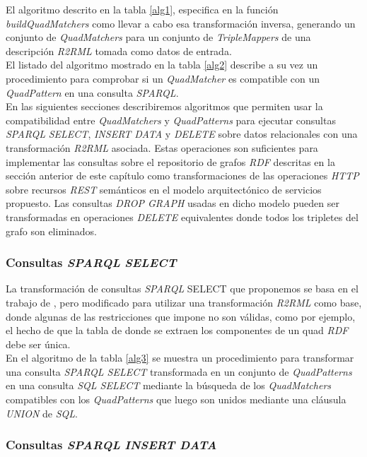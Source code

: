 El algoritmo descrito en la tabla \ref{alg1}, especifica en la funci\'on \textit{buildQuadMatchers} como llevar a cabo esa transformaci\'on inversa, generando un conjunto de \textit{QuadMatchers} para un conjunto de \textit{TripleMappers} de una descripci\'on \textit{R2RML} tomada como datos de entrada.\\
El listado del algoritmo mostrado en la tabla \ref{alg2} describe a su vez un procedimiento para comprobar si un \textit{QuadMatcher} es compatible con un \textit{QuadPattern} en una consulta \textit{SPARQL}.\\
En las siguientes secciones describiremos algoritmos que permiten usar la compatibilidad entre \textit{QuadMatchers} y \textit{QuadPatterns} para ejecutar consultas \textit{SPARQL} \textit{SELECT}, \textit{INSERT DATA} y \textit{DELETE} sobre datos relacionales con una transformaci\'on \textit{R2RML} asociada. Estas operaciones son suficientes para implementar las consultas sobre el repositorio de grafos \textit{RDF} descritas en la secci\'on anterior de este cap\'itulo como transformaciones de las operaciones \textit{HTTP} sobre recursos \textit{REST} sem\'anticos en el modelo arquitect\'onico de servicios propuesto. Las consultas \textit{DROP GRAPH} usadas en dicho modelo pueden ser transformadas en operaciones \textit{DELETE} equivalentes donde todos los tripletes del grafo son eliminados.

\subsubsection{Consultas \textit{SPARQL} \textit{SELECT}}

La transformaci\'on de consultas \textit{SPARQL} SELECT que proponemos se basa en el trabajo de \cite{chebotko2009semantics}, pero modificado para utilizar una transformaci\'on \textit{R2RML} como base, donde algunas de las restricciones que impone no son v\'alidas, como por ejemplo, el hecho de que la tabla de donde se extraen los componentes de un quad \textit{RDF} debe ser \'unica.\\
En el algoritmo de la tabla \ref{alg3} se muestra un procedimiento para transformar una consulta \textit{SPARQL SELECT} transformada en un conjunto de \textit{QuadPatterns} en una consulta \textit{SQL SELECT} mediante la b\'usqueda de los \textit{QuadMatchers} compatibles con los \textit{QuadPatterns} que luego son unidos mediante una cl\'ausula \textit{UNION} de \textit{SQL}.

\subsubsection{Consultas \textit{SPARQL} \textit{INSERT DATA}}

